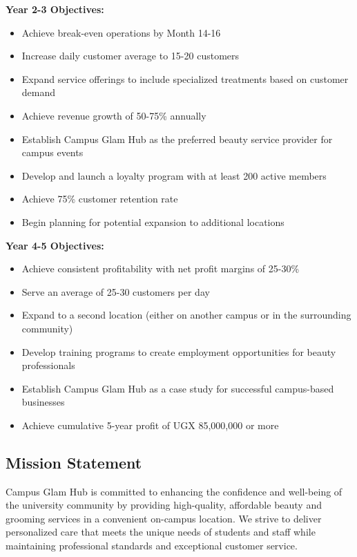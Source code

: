 \textbf{Year 2-3 Objectives:}
\begin{itemize}[leftmargin=2em]
    \item Achieve break-even operations by Month 14-16
    \item Increase daily customer average to 15-20 customers
    \item Expand service offerings to include specialized treatments based on customer demand
    \item Achieve revenue growth of 50-75\% annually
    \item Establish Campus Glam Hub as the preferred beauty service provider for campus events
    \item Develop and launch a loyalty program with at least 200 active members
    \item Achieve 75\% customer retention rate
    \item Begin planning for potential expansion to additional locations
\end{itemize}

\textbf{Year 4-5 Objectives:}
\begin{itemize}[leftmargin=2em]
    \item Achieve consistent profitability with net profit margins of 25-30\%
    \item Serve an average of 25-30 customers per day
    \item Expand to a second location (either on another campus or in the surrounding community)
    \item Develop training programs to create employment opportunities for beauty professionals
    \item Establish Campus Glam Hub as a case study for successful campus-based businesses
    \item Achieve cumulative 5-year profit of UGX 85,000,000 or more
\end{itemize}

\subsection{Mission Statement}

Campus Glam Hub is committed to enhancing the confidence and well-being of the university community by providing high-quality, affordable beauty and grooming services in a convenient on-campus location. We strive to deliver personalized care that meets the unique needs of students and staff while maintaining professional standards and exceptional customer service.

